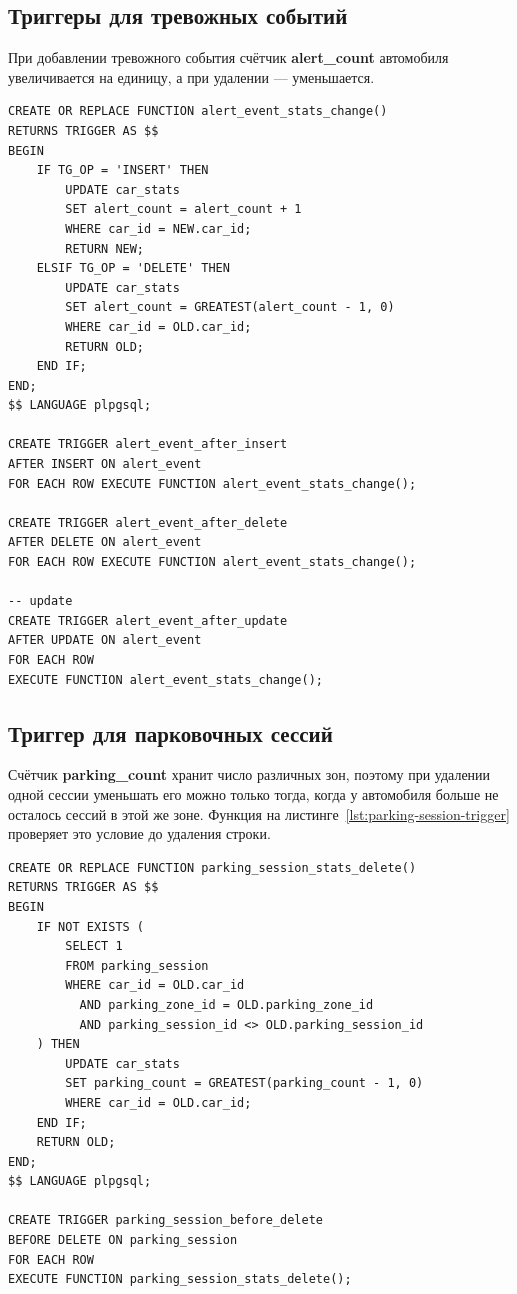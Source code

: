 \subsection{Триггеры для тревожных событий}
При добавлении тревожного события счётчик \textbf{alert\_count} автомобиля
увеличивается на единицу, а при удалении --- уменьшается.

\begin{lstlisting}[style=sqlstyle, caption={Функция и триггеры для таблицы \texttt{alert\_event}}, label={lst:alert-triggers}]
CREATE OR REPLACE FUNCTION alert_event_stats_change()
RETURNS TRIGGER AS $$
BEGIN
    IF TG_OP = 'INSERT' THEN
        UPDATE car_stats
        SET alert_count = alert_count + 1
        WHERE car_id = NEW.car_id;
        RETURN NEW;
    ELSIF TG_OP = 'DELETE' THEN
        UPDATE car_stats
        SET alert_count = GREATEST(alert_count - 1, 0)
        WHERE car_id = OLD.car_id;
        RETURN OLD;
    END IF;
END;
$$ LANGUAGE plpgsql;

CREATE TRIGGER alert_event_after_insert
AFTER INSERT ON alert_event
FOR EACH ROW EXECUTE FUNCTION alert_event_stats_change();

CREATE TRIGGER alert_event_after_delete
AFTER DELETE ON alert_event
FOR EACH ROW EXECUTE FUNCTION alert_event_stats_change();

-- update
CREATE TRIGGER alert_event_after_update
AFTER UPDATE ON alert_event
FOR EACH ROW
EXECUTE FUNCTION alert_event_stats_change();
\end{lstlisting}

\newpage

\subsection{Триггер для парковочных сессий}
Счётчик \textbf{parking\_count} хранит число различных зон, поэтому при
удалении одной сессии уменьшать его можно только тогда, когда у автомобиля
больше не осталось сессий в этой же зоне. Функция на
листинге~\ref{lst:parking-session-trigger} проверяет это условие до удаления
строки.

\begin{lstlisting}[style=sqlstyle, caption={Триггер удаления парковочной сессии}, label={lst:parking-session-trigger}]
CREATE OR REPLACE FUNCTION parking_session_stats_delete()
RETURNS TRIGGER AS $$
BEGIN
    IF NOT EXISTS (
        SELECT 1
        FROM parking_session
        WHERE car_id = OLD.car_id
          AND parking_zone_id = OLD.parking_zone_id
          AND parking_session_id <> OLD.parking_session_id
    ) THEN
        UPDATE car_stats
        SET parking_count = GREATEST(parking_count - 1, 0)
        WHERE car_id = OLD.car_id;
    END IF;
    RETURN OLD;
END;
$$ LANGUAGE plpgsql;

CREATE TRIGGER parking_session_before_delete
BEFORE DELETE ON parking_session
FOR EACH ROW
EXECUTE FUNCTION parking_session_stats_delete();
\end{lstlisting}

